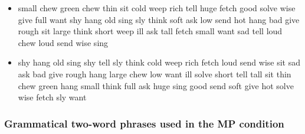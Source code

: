 \documentclass[10pt,letterpaper]{article}
\begin{document}
\begin{itemize}
  \item small chew green chew thin sit cold weep rich tell huge fetch
    good solve wise give full want shy hang old sing sly think soft
    ask low send hot hang bad give rough sit large think short weep
    ill ask tall fetch small want sad tell loud chew loud send wise
    sing

  \item shy hang old sing shy tell sly think cold weep rich fetch loud
    send wise sit sad ask bad give rough hang large chew low want ill
    solve short tell tall sit thin chew green hang small think full
    ask huge sing good send soft give hot solve wise fetch sly want

\end{itemize}

\subsubsection*{Grammatical two-word phrases used in the MP condition}
\end{document}
